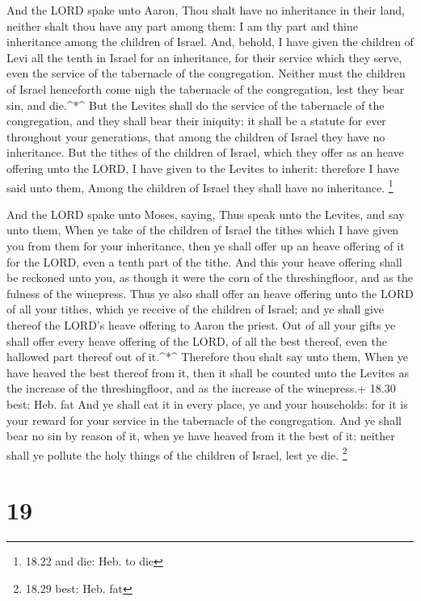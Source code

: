  And the LORD spake unto Aaron, Thou shalt have no
inheritance in their land, neither shalt thou have any part among them:
I am thy part and thine inheritance among the children of Israel.
 And, behold, I have given the children of Levi all the
tenth in Israel for an inheritance, for their service which they serve,
even the service of the tabernacle of the congregation. 
Neither must the children of Israel henceforth come nigh the tabernacle
of the congregation, lest they bear sin, and die.\^{}*\^{} 
But the Levites shall do the service of the tabernacle of the
congregation, and they shall bear their iniquity: it shall be a statute
for ever throughout your generations, that among the children of Israel
they have no inheritance.  But the tithes of the children
of Israel, which they offer as an heave offering unto the LORD, I have
given to the Levites to inherit: therefore I have said unto them, Among
the children of Israel they shall have no inheritance. \footnote{18.22
  and die: Heb. to die}

 And the LORD spake unto Moses, saying,  Thus
speak unto the Levites, and say unto them, When ye take of the children
of Israel the tithes which I have given you from them for your
inheritance, then ye shall offer up an heave offering of it for the
LORD, even a tenth part of the tithe.  And this your heave
offering shall be reckoned unto you, as though it were the corn of the
threshingfloor, and as the fulness of the winepress.  Thus
ye also shall offer an heave offering unto the LORD of all your tithes,
which ye receive of the children of Israel; and ye shall give thereof
the LORD's heave offering to Aaron the priest.  Out of all
your gifts ye shall offer every heave offering of the LORD, of all the
best thereof, even the hallowed part thereof out of it.\^{}*\^{}
 Therefore thou shalt say unto them, When ye have heaved
the best thereof from it, then it shall be counted unto the Levites as
the increase of the threshingfloor, and as the increase of the
winepress.+ 18.30 best: Heb. fat  And ye shall eat it in
every place, ye and your households: for it is your reward for your
service in the tabernacle of the congregation.  And ye
shall bear no sin by reason of it, when ye have heaved from it the best
of it: neither shall ye pollute the holy things of the children of
Israel, lest ye die. \footnote{18.29 best: Heb. fat}

\hypertarget{section-18}{%
\section{19}\label{section-18}}

